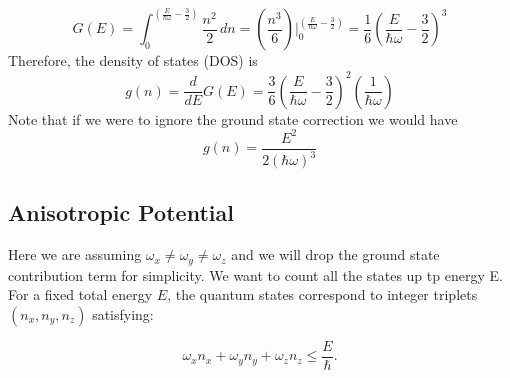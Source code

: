 \documentclass{article}
\numberwithin{equation}{section}
\numberwithin{equation}{subsection}
\begin{document}
\begin{equation}
    G(\mathit{E}) = \int_{0}^{(\frac{E}{\hbar\omega}-\frac{3}{2})} \frac{\mathit{n}^2}{2} \,d\mathit{n} = \left(\frac{\mathit{n}^3}{6}\right)\bigg|_{0}^{(\frac{E}{\hbar\omega}-\frac{3}{2})} = \frac{1}{6}\left(\frac{E}{\hbar\omega}-\frac{3}{2}\right)^3
\end{equation}
Therefore, the density of states (DOS) is 
\begin{equation}
    g(\mathit{n}) = \frac{d}{d E}G(\mathit{E}) = \frac{3}{6}\left(\frac{E}{\hbar\omega}-\frac{3}{2}\right)^2\left(\frac{1}{\hbar \omega}\right)
\end{equation}
Note that if we were to ignore the ground state correction we would have
\begin{equation}
    g(\mathit{n}) = \frac{E^2}{2(\hbar\omega)^3}
\end{equation}

\subsection{Anisotropic Potential}
Here we are assuming $\omega_{\mathit{x}} \neq \omega_{\mathit{y}} \neq \omega_{\mathit{z}}$ and we will drop the ground state contribution term for simplicity. We want to count all the states up tp energy E. For a fixed total energy \(E\), the quantum states correspond to integer triplets \((\mathit{n}_{\mathit{x}},\mathit{n}_{\mathit{y}},\mathit{n}_{\mathit{z}})\) satisfying:

\[
\omega_{\mathit{x}} \mathit{n}_{\mathit{x}} + \omega_{\mathit{y}} \mathit{n}_{\mathit{y}} + \omega_{\mathit{z}} \mathit{n}_{\mathit{z}} \leq \frac{E}{\hbar}.
\]
\end{document}
